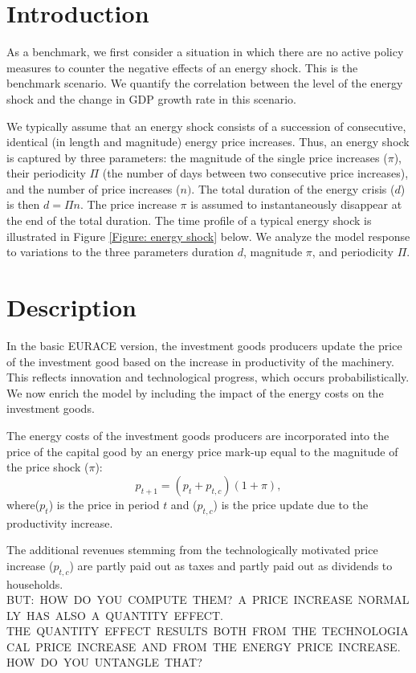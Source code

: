 
\section{Introduction}

As a benchmark, we first consider a situation in which there are no active
policy measures to counter the negative effects of an energy shock. This is the
benchmark scenario. We quantify the correlation between the level of the
energy shock and the change in GDP growth rate in this scenario.

We typically assume that an energy shock consists of a succession of
consecutive, identical (in length and magnitude) energy price increases.
Thus, an energy shock is captured by three parameters: the magnitude of the
single price increases ($\pi$), their periodicity $\Pi$ (the number of
days between two consecutive price increases), and the number of price
increases ($n).$ The total duration of the energy crisis ($d$) is then $%
d=\Pi n$. The price increase $\pi$ is assumed to instantaneously disappear at the end
of the total duration. The time profile of a typical energy shock is illustrated in Figure
\ref{Figure: energy shock} below.
We analyze the model response to variations to the three parameters duration
$d$, magnitude $\pi$, and periodicity $\Pi$.

\section{Description}

In the basic EURACE version, the investment goods producers update the price
of the investment good based on the increase in productivity of the
machinery. This reflects innovation and technological progress, which occurs
probabilistically. We now enrich the model by including the impact of the
energy costs on the investment goods.

The energy costs of the investment goods producers are incorporated into the
price of the capital good by an energy price mark-up equal to the magnitude
of the price shock ($\pi $):
\begin{equation}
p_{t+1}=(p_{t}+p_{t,c})(1+\pi ),
\end{equation}%
where($p_{t}$) is the price in period $t$ and ($p_{t,c}$) is the price
update due to the productivity increase.

The additional revenues stemming from the technologically motivated price
increase ($p_{t,c}$) are partly paid out as taxes and partly paid out as
dividends to households. BUT:\ HOW\ DO\ YOU\ COMPUTE\ THEM?\ A\ PRICE\
INCREASE\ NORMALLY\ HAS\ ALSO\ A\ QUANTITY\ EFFECT. THE\ QUANTITY\ EFFECT\
RESULTS\ BOTH\ FROM\ THE\ TECHNOLOGIACAL\ PRICE\ INCREASE\ AND\ FROM\ THE\
ENERGY\ PRICE\ INCREASE. HOW\ DO\ YOU\ UNTANGLE\ THAT?

